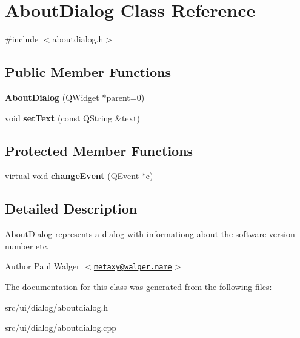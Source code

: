 \hypertarget{classAboutDialog}{
\section{AboutDialog Class Reference}
\label{classAboutDialog}
}


{\ttfamily \#include $<$aboutdialog.h$>$}\subsection*{Public Member Functions}
\begin{DoxyCompactItemize}
\item 
\hypertarget{classAboutDialog_ad96fc2ce8de7568ace543b7c69c71c56}{
{\bfseries AboutDialog} (QWidget $\ast$parent=0)}
\label{classAboutDialog_ad96fc2ce8de7568ace543b7c69c71c56}

\item 
\hypertarget{classAboutDialog_a42c59fd60ea452b58e1126416e63c920}{
void {\bfseries setText} (const QString \&text)}
\label{classAboutDialog_a42c59fd60ea452b58e1126416e63c920}

\end{DoxyCompactItemize}
\subsection*{Protected Member Functions}
\begin{DoxyCompactItemize}
\item 
\hypertarget{classAboutDialog_abac18da2759d1b4bb0e5bca856b0efcf}{
virtual void {\bfseries changeEvent} (QEvent $\ast$e)}
\label{classAboutDialog_abac18da2759d1b4bb0e5bca856b0efcf}

\end{DoxyCompactItemize}


\subsection{Detailed Description}
\hyperlink{classAboutDialog}{AboutDialog} represents a dialog with informationg about the software version number etc.

\begin{DoxyAuthor}{Author}
Paul Walger $<$\href{mailto:metaxy@walger.name}{\tt metaxy@walger.name}$>$ 
\end{DoxyAuthor}


The documentation for this class was generated from the following files:\begin{DoxyCompactItemize}
\item 
src/ui/dialog/aboutdialog.h\item 
src/ui/dialog/aboutdialog.cpp\end{DoxyCompactItemize}
